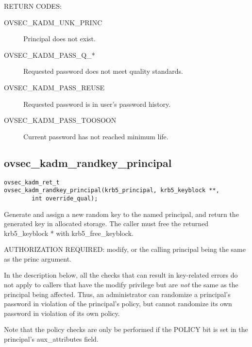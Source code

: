 RETURN CODES:

\begin{description}
\item[OVSEC_KADM_UNK_PRINC] Principal does not exist.
\item[OVSEC_KADM_PASS_Q_*] Requested password does not meet quality
standards. 
\item[OVSEC_KADM_PASS_REUSE] Requested password is in user's
password history. 
\item[OVSEC_KADM_PASS_TOOSOON] Current password has not reached minimum
life. 
\end{description}

\subsection{ovsec_kadm_randkey_principal}

\begin{verbatim}
ovsec_kadm_ret_t
ovsec_kadm_randkey_principal(krb5_principal, krb5_keyblock **,
		int override_qual);
\end{verbatim}

Generate and assign a new random key to the named principal, and
return the generated key in allocated storage.  The caller must free
the returned krb5_keyblock * with krb5_free_keyblock.

AUTHORIZATION REQUIRED: modify, or the calling principal being the
same as the princ argument.

In the description below, all the checks that can result in
key-related errors do not apply to callers that have the modify
privilege but are {\it not} the same as the principal being affected.
Thus, an administrator can randomize a principal's password in
violation of the principal's policy, but cannot randomize its own
password in violation of its own policy.

Note that the policy checks are only be performed if the POLICY bit is
set in the principal's aux_attributes field.


